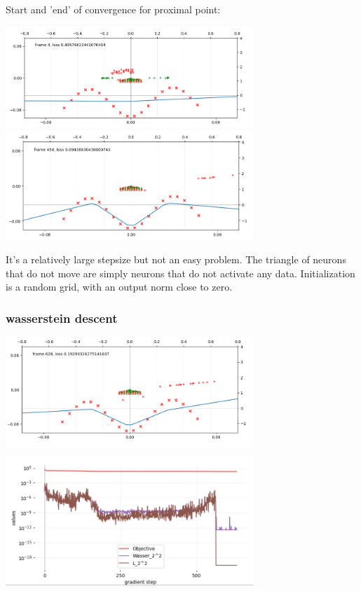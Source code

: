 Start and 'end' of convergence for proximal point:

\includegraphics[width=0.7\textwidth]{imgs/tau10_plot_start.png}
\includegraphics[width=0.7\textwidth]{imgs/tau10_plot_end.png}

It's a relatively large stepsize but not an easy problem. The triangle of neurons that do not move are simply neurons that do not activate any data. Initialization is a random grid, with an output norm close to zero.

\subsubsection{wasserstein descent}

\includegraphics[width=0.7\textwidth]{imgs/tau10_plot_wasser_end.png}

\includegraphics[width=0.7\textwidth]{imgs/tau10_graph_wasser.png}

